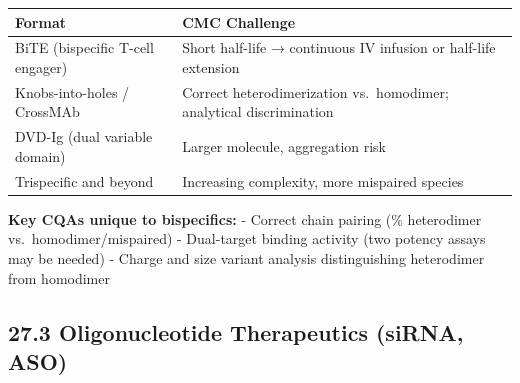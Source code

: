 \documentclass[
  11pt,
  a4paper,
]{report}
\begin{document}
\begin{longtable}[]{@{}ll@{}}
\toprule
\begin{minipage}[b]{0.34\columnwidth}\raggedright
Format\strut
\end{minipage} & \begin{minipage}[b]{0.60\columnwidth}\raggedright
CMC Challenge\strut
\end{minipage}\tabularnewline
\midrule
\endhead
\begin{minipage}[t]{0.34\columnwidth}\raggedright
BiTE (bispecific T-cell engager)\strut
\end{minipage} & \begin{minipage}[t]{0.60\columnwidth}\raggedright
Short half-life → continuous IV infusion or half-life extension\strut
\end{minipage}\tabularnewline
\begin{minipage}[t]{0.34\columnwidth}\raggedright
Knobs-into-holes / CrossMAb\strut
\end{minipage} & \begin{minipage}[t]{0.60\columnwidth}\raggedright
Correct heterodimerization vs.~homodimer; analytical
discrimination\strut
\end{minipage}\tabularnewline
\begin{minipage}[t]{0.34\columnwidth}\raggedright
DVD-Ig (dual variable domain)\strut
\end{minipage} & \begin{minipage}[t]{0.60\columnwidth}\raggedright
Larger molecule, aggregation risk\strut
\end{minipage}\tabularnewline
\begin{minipage}[t]{0.34\columnwidth}\raggedright
Trispecific and beyond\strut
\end{minipage} & \begin{minipage}[t]{0.60\columnwidth}\raggedright
Increasing complexity, more mispaired species\strut
\end{minipage}\tabularnewline
\bottomrule
\end{longtable}

\textbf{Key CQAs unique to bispecifics:} - Correct chain pairing (\%
heterodimer vs.~homodimer/mispaired) - Dual-target binding activity (two
potency assays may be needed) - Charge and size variant analysis
distinguishing heterodimer from homodimer

\hypertarget{oligonucleotide-therapeutics-sirna-aso}{%
\subsection{27.3 Oligonucleotide Therapeutics (siRNA,
ASO)}\label{oligonucleotide-therapeutics-sirna-aso}}
\end{document}
